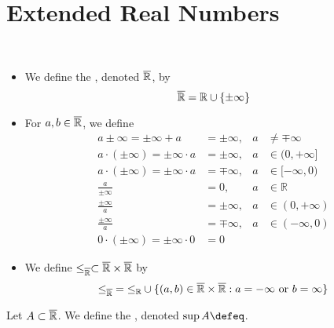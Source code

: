 \documentclass{book}
\begin{document}
	
	
	
	
	
	
	
	
	
	
	
	
	
	
	
	
	
	
	
	\section{Extended Real Numbers}
	
	
	\begin{defn}\
		\begin{itemize}
			\item We define the , denoted $\overline{\mathbb{R}}$, by 
			$$ \overline{\mathbb{R}} = \mathbb{R} \cup \{\pm \infty\}$$
			\item For $a,b \in \overline{\mathbb{R}}$, we define
			\begin{align*}
				a \pm \infty = \pm\infty + a & = \pm\infty, & a & \neq \mp\infty \\
				a \cdot (\pm\infty) = \pm\infty \cdot a & = \pm\infty, & a & \in (0, +\infty] \\
				a \cdot (\pm\infty) = \pm\infty \cdot a & = \mp\infty, & a & \in [-\infty, 0) \\
				\frac{a}{\pm\infty} & = 0, & a & \in \mathbb{R} \\
				\frac{\pm\infty}{a} & = \pm\infty, & a & \in (0, +\infty) \\
				\frac{\pm\infty}{a} & = \mp\infty, & a & \in (-\infty, 0) \\
				0 \cdot (\pm\infty) = \pm\infty \cdot 0 & = 0
			\end{align*}
			\item We define $\leq_{\overline{\mathbb{R}}} \subset \overline{\mathbb{R}} \times \overline{\mathbb{R}}$ by 
			$${\leq_{\overline{\mathbb{R}}}}  =  {\leq_{\mathbb{R}}} \cup  \{(a,b) \in \overline{\mathbb{R}} \times \overline{\mathbb{R}}: a = - \infty \text{ or } b = \infty\}$$
		\end{itemize}
	\end{defn}
	
	\begin{defn}
		Let $A \subset \overline{\mathbb{R}}$. We define the , denoted $\sup A \defeq$.
	\end{defn}
	
\end{document}
